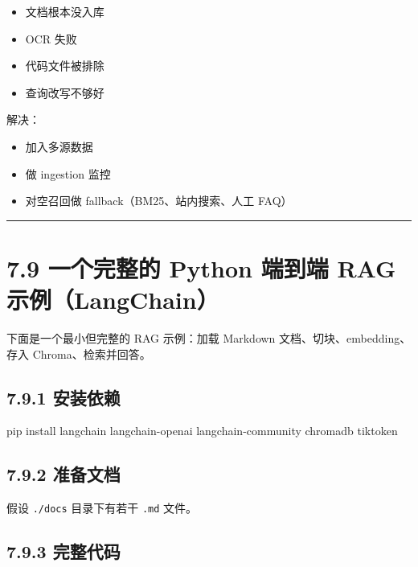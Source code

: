 \begin{itemize}[leftmargin=2em]
\item 文档根本没入库
\item OCR 失败
\item 代码文件被排除
\item 查询改写不够好
\end{itemize}

解决：


\begin{itemize}[leftmargin=2em]
\item 加入多源数据
\item 做 ingestion 监控
\item 对空召回做 fallback（BM25、站内搜索、人工 FAQ）
\end{itemize}

\bigskip\hrule\bigskip

\section{7.9 一个完整的 Python 端到端 RAG 示例（LangChain）}

下面是一个最小但完整的 RAG 示例：加载 Markdown 文档、切块、embedding、存入 Chroma、检索并回答。


\subsection{7.9.1 安装依赖}

\begin{codeblock}
pip install langchain langchain-openai langchain-community chromadb tiktoken
\end{codeblock}

\subsection{7.9.2 准备文档}

假设 \texttt{./docs} 目录下有若干 \texttt{.md} 文件。


\subsection{7.9.3 完整代码}

